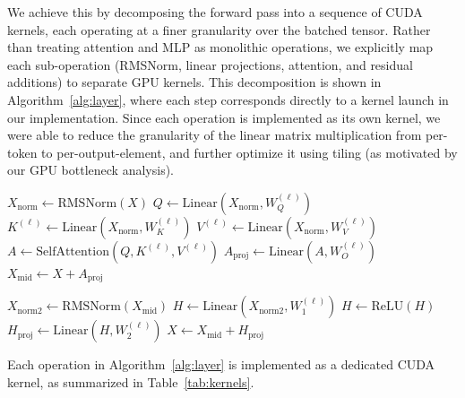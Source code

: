 We achieve this by decomposing the forward pass into a sequence of CUDA kernels, each operating at a finer granularity over the batched tensor. Rather than treating attention and MLP as monolithic operations, we explicitly map each sub-operation (RMSNorm, linear projections, attention, and residual additions) to separate GPU kernels. This decomposition is shown in Algorithm~\ref{alg:layer}, where each step corresponds directly to a kernel launch in our implementation. Since each operation is implemented as its own kernel, we were able to reduce the granularity of the linear matrix multiplication from per-token to per-output-element, and further optimize it using tiling (as motivated by our GPU bottleneck analysis).
\begin{algorithm}[H]
\caption{Layer-by-Layer GPU Forward Pass}
\label{alg:layer}
\begin{algorithmic}

    \State \textcolor{attncolor}{$X_{\text{norm}} \gets \text{RMSNorm}(X)$} \textcolor{attncolor}{}
    \State \textcolor{attncolor}{$Q \gets \text{Linear}(X_{\text{norm}}, W_Q^{(\ell)})$}
    \State \textcolor{attncolor}{$K^{(\ell)} \gets \text{Linear}(X_{\text{norm}}, W_K^{(\ell)})$}
    \State \textcolor{attncolor}{$V^{(\ell)} \gets \text{Linear}(X_{\text{norm}}, W_V^{(\ell)})$}
    \State \textcolor{attncolor}{$A \gets \text{SelfAttention}(Q, K^{(\ell)}, V^{(\ell)})$}
    \State \textcolor{attncolor}{$A_{\text{proj}} \gets \text{Linear}(A, W_O^{(\ell)})$}
    \State \textcolor{attncolor}{$X_{\text{mid}} \gets X + A_{\text{proj}}$}

    \State \textcolor{mlpcolor}{$X_{\text{norm2}} \gets \text{RMSNorm}(X_{\text{mid}})$} \textcolor{mlpcolor}{}
    \State \textcolor{mlpcolor}{$H \gets \text{Linear}(X_{\text{norm2}}, W_1^{(\ell)})$}
    \State \textcolor{mlpcolor}{$H \gets \text{ReLU}(H)$}
    \State \textcolor{mlpcolor}{$H_{\text{proj}} \gets \text{Linear}(H, W_2^{(\ell)})$}
    \State \textcolor{mlpcolor}{$X \gets X_{\text{mid}} + H_{\text{proj}}$}

\EndFor
\end{algorithmic}
\end{algorithm}

Each operation in Algorithm~\ref{alg:layer} is implemented as a dedicated CUDA kernel, as summarized in Table~\ref{tab:kernels}.


